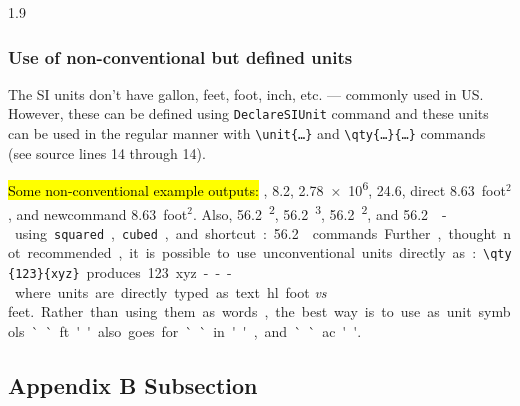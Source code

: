 \documentclass[ms-thesis,12pt,chapterrefs]{ndsu-thesis-2022}
\newcommand\myspacing{1.9} %
\newcommand{\sqft}[1]{\qty{#1}{foot}$^2$\xspace}%
\newcommand{\cuft}[1]{\qty{#1}{\cubic\ft}\xspace}%
\begin{document}
\begin{spacing}{\myspacing}
\subsubsection{Use of non-conventional but defined units}
The SI units don't have gallon, feet, foot, inch, etc. --- commonly used in US. However, these can be defined using \texttt{DeclareSIUnit} command and these units can be used in the regular manner with \texttt{\textbackslash unit\{\ldots\}} and \texttt{\textbackslash qty\{\ldots\}\{\ldots\}} commands (see source lines 14 through 14). 

\hl{Some non-conventional example outputs:} \unit{\gal}, \qty{8.2}{\gal}, \qty{2.78e6}{\gal}, \qty{24.6}{\ft}, direct \qty{8.63}{foot}$^2$\xspace, and newcommand \sqft{8.63}. Also, \qty{56.2}{\ft\tothe{2}}, \qty{56.2}{\ft\tothe{3}}, \qty{56.2}{\ft\squared}, and \qty{56.2}{\cubic\ft} - using \texttt{squared}, \texttt{cubed}, and shortcut: \cuft{56.2} commands. Further, thought not recommended, it is possible to use unconventional units directly as: \verb|\qty{123}{xyz}| produces \qty{123}{xyz} --- where units are directly typed as text. 

\hl{foot \emph{vs} feet.} Rather than using them as words, the best way is to use as unit symbols ``ft'' also goes for ``in'', and ``ac''. 


\subsection{Appendix B Subsection}
\kant[11]

\closeappendices   %

\end{spacing}
\end{document}
